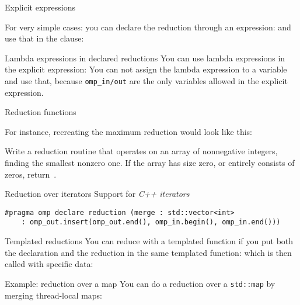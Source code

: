  {Explicit expressions}

For very simple cases:
%
%
you can declare the reduction through an expression:
%
%
and use that in the  clause:
%

\begin{cppnote}{Lambda expressions in declared reductions}
  You can use lambda expressions in the explicit expression:
  You can not assign the lambda expression to a variable and use that,
  because \lstinline{omp_in/out} are the only variables allowed
  in the explicit expression.
\end{cppnote}

 {Reduction functions}

For instance, recreating the maximum reduction would look like this:
%

\begin{exercise}
  Write a reduction routine that operates on an array of nonnegative
  integers, finding the smallest nonzero one. If the array has size
  zero, or entirely consists of zeros, return~.
\end{exercise}

\begin{cppnote}{Reduction over iterators}
  Support for
  \emph{C++ iterators}
\begin{lstlisting}
#pragma omp declare reduction (merge : std::vector<int>
    : omp_out.insert(omp_out.end(), omp_in.begin(), omp_in.end())) 
\end{lstlisting}
\end{cppnote}

\begin{cppnote}{Templated reductions}
  You can reduce with a templated function
  if you put both the declaration and the reduction
  in the same templated function:
  which is then called with specific data:
\end{cppnote}

\begin{cppnote}{Example: reduction over a map}
  You can do a reduction over a \lstinline{std::map}
  by merging thread-local maps:
  \begin{multicols}{2}
    \columnbreak
  \end{multicols}
\end{cppnote}

